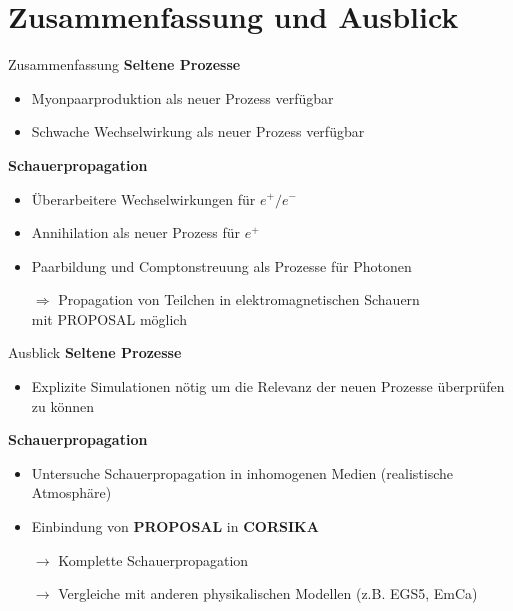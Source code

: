 \documentclass[aspectratio=1610, captions=tableheading, 11pt]{beamer}
\begin{document}

\section{Zusammenfassung und Ausblick}

\begin{frame}{Zusammenfassung}
    \textbf{Seltene Prozesse}
   \begin{itemize}
    \setlength\itemsep{0.5em}
    \item Myonpaarproduktion als neuer Prozess verfügbar 
    \item Schwache Wechselwirkung als neuer Prozess verfügbar
   \end{itemize}

   \textbf{Schauerpropagation}
   \begin{itemize}
    \setlength\itemsep{0.5em}
    \item Überarbeitere Wechselwirkungen für $e^+/e^-$
    \item Annihilation als neuer Prozess für $e^+$
    \item Paarbildung und Comptonstreuung als Prozesse für Photonen
    \item[$\Rightarrow$] Propagation von Teilchen in elektromagnetischen Schauern \\mit PROPOSAL möglich
   \end{itemize}
\end{frame}


\begin{frame}{Ausblick}
    \textbf{Seltene Prozesse}
   \begin{itemize}
    \setlength\itemsep{0.5em}
    \item Explizite Simulationen nötig um die Relevanz der neuen Prozesse überprüfen zu können
   \end{itemize}

   \textbf{Schauerpropagation}
   \begin{itemize}
    \setlength\itemsep{0.5em}
    \item Untersuche Schauerpropagation in inhomogenen Medien (realistische Atmosphäre)
    \item Einbindung von \textbf{PROPOSAL} in \textbf{CORSIKA}
    \item[$\rightarrow$] Komplette Schauerpropagation
    \item[$\rightarrow$] Vergleiche mit anderen physikalischen Modellen (z.B. EGS5, EmCa)
   \end{itemize}
\end{frame}
\end{document}
